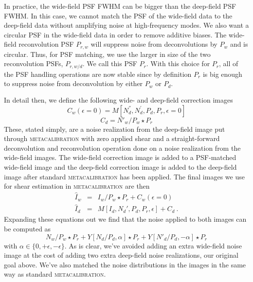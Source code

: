 \documentclass[twocolumn]{openjournal}
\makeatletter
\newcommand{\mcal}{\textsc{metacalibration}\@\xspace}
\makeatother
\begin{document}
In practice, the wide-field PSF FWHM can be bigger than the deep-field PSF FWHM.
In this case, we cannot match the PSF of the wide-field data to the deep-field data
without amplifying noise at high-frequency modes. We also want a circular PSF in the
wide-field data in order to remove additive biases. The wide-field reconvolution PSF
$P_{r,w}$ will suppress noise from deconvolutions by $P_{w}$ and is circular.
Thus, for PSF matching, we use the larger in size of the two
reconvolution PSFs, $P_{r,w/d}$. We call this PSF $P_{r}$. With this
choice for $P_{r}$, all of the PSF handling operations are now stable since by
definition $P_{r}$ is big enough to suppress noise from deconvolution by either
$P_{w}$ or $P_{d}$.

In detail then, we define the following wide- and deep-field correction images
\begin{equation}\label{eqn:cw}
C_{w}(\epsilon=0) = M[N^{''}_d, N^{'}_d, P_d, P_{r}, \epsilon=0]
\end{equation}
\begin{equation}\label{eqn:cd}
C_{d} = N'_{w}/P_{w} \star P_{r}
\end{equation}
These, stated simply, are a noise realization from the deep-field image put through
\mcal with zero applied shear and a straight-forward deconvolution and reconvolution
operation done on a noise realization from the wide-field images. The wide-field
correction image is added to a PSF-matched wide-field image and the deep-field
correction image is added to the deep-field image after standard \mcal has been applied.
The final images we use for shear estimation in \mcal are then
\begin{eqnarray}
\hat I_{w} & = & I_{w}/P_{w} \star P_{r} + C_{w}(\epsilon=0)\\
\hat I_{d} & = & M[I_{d}, N_{d}', P_{d}, P_{r}, \epsilon] + C_{d}\ .
\end{eqnarray}
Expanding these equations out we find that the noise applied to both images can be
computed as
\begin{equation*}
N_{w}/P_{w}\star P_{r} + Y[N_{d}/P_{d}, \alpha] \star P_{r} + Y[N'_d/P_d, -\alpha] \star P_{r}
\end{equation*}
with $\alpha\in\{0,+\epsilon,-\epsilon\}$. As is clear, we've avoided adding an extra
wide-field noise image at the cost of adding two extra deep-field noise realizations,
our original goal above. We've also matched the noise distributions in the images in the
same way as standard \mcal.
\end{document}
